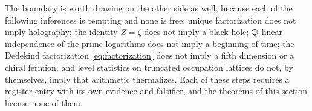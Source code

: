 The boundary is worth drawing on the other side as well, because each of the following
inferences is tempting and none is free: unique factorization does not imply holography;
the identity $Z=\zeta$ does not imply a black hole; $\mathbb{Q}$-linear independence of the prime
logarithms does not imply a beginning of time; the Dedekind factorization
\eqref{eq:factorization} does not imply a fifth dimension or a chiral fermion; and level
statistics on truncated occupation lattices do not, by themselves, imply that arithmetic
thermalizes. Each of these steps requires a register entry with its own evidence and
falsifier, and the theorems of this section license none of them.
